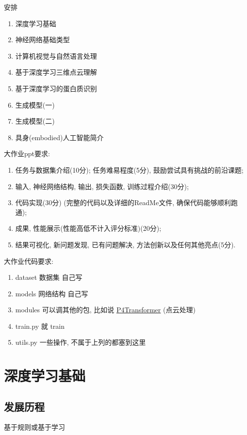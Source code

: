 \newpage
安排
\begin{enumerate}
    \item 深度学习基础
    \item 神经网络基础类型
    \item 计算机视觉与自然语言处理
    \item 基于深度学习三维点云理解
    \item 基于深度学习的蛋白质识别
    \item 生成模型(一)
    \item 生成模型(二)
    \item 具身(embodied)人工智能简介
\end{enumerate}

大作业ppt要求:
\begin{enumerate}\small
    \item 	任务与数据集介绍(10分); 任务难易程度(5分), 鼓励尝试具有挑战的前沿课题; 
    \item 输入, 神经网络结构, 输出, 损失函数, 训练过程介绍(30分); 
    \item 代码实现(30分) (完整的代码以及详细的ReadMe文件, 确保代码能够顺利跑通); 
    \item 成果, 性能展示(性能高低不计入评分标准)(20分); 
    \item 结果可视化, 新问题发现, 已有问题解决, 方法创新以及任何其他亮点(5分).     
\end{enumerate}

大作业代码要求:
\begin{enumerate}
    \item dataset 数据集 自己写
    \item models 网络结构 自己写
    \item modules 可以调其他的包, 比如说 \href{https://github.com/hehefan/P4Transformer/tree/main/modules-pytorch-1.4.0}{P4Transformer} (点云处理)
    \item train.py 就 train
    \item utils.py 一些操作, 不属于上列的都塞到这里
\end{enumerate}

\section{深度学习基础}

\subsection{发展历程}
基于规则或基于学习 

